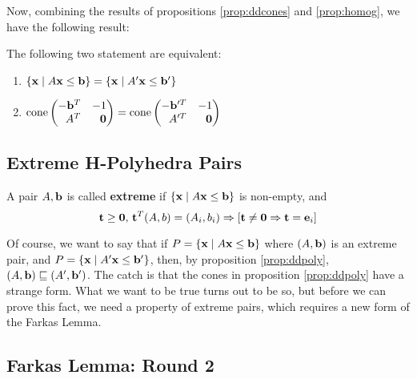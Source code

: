 Now, combining the results of propositions \ref{prop:ddcones} and \ref{prop:homog}, we have the following result:

\begin{Prop}{\label{prop:ddpoly}
		The following two statement are equivalent:
		\begin{enumerate}
			\item $\left\{\mathbf{x}\;|\; A\mathbf{x}\leq \mathbf{b}\right\} = \left\{\mathbf{x}\;|\; A'\mathbf{x}\leq \mathbf{b}'\right\}$
			\item $\cone \pmb -\b^T & -1 \\ A^T & \0 \pme = \cone \pmb -\b'^T & -1 \\ A'^T & \0 \pme$
		\end{enumerate}
	}\end{Prop}

\subsection{Extreme H-Polyhedra Pairs}
\begin{Def}{
		A pair $A,\mathbf{b}$ is called \textbf{extreme} if $\left\{\mathbf{x}\;|\; A\mathbf{x}\leq \mathbf{b}\right\}$ is non-empty, and
		\[ \mathbf{t} \geq \mathbf{0},\, \mathbf{t}^T(A,b) = (A_i,b_i) \Rightarrow [\mathbf{t} \neq \mathbf{0} \Rightarrow \mathbf{t} = \mathbf{e}_i] \]
	}\end{Def}

Of course, we want to say that if $P = \left\{\mathbf{x}\;|\; A\mathbf{x}\leq \mathbf{b}\right\}$ where $(A,\mathbf{b})$ is an extreme pair, and $P = \left\{\mathbf{x}\;|\; A'\mathbf{x}\leq \mathbf{b}'\right\}$, then, by proposition \ref{prop:ddpoly}, $(A,\mathbf{b}) \sqsubseteq (A',\mathbf{b}')$.  The catch is that the cones in proposition \ref{prop:ddpoly} have a strange form.  What we want to be true turns out to be so, but before we can prove this fact, we need a property of extreme pairs, which requires a new form of the Farkas Lemma.

\subsection{Farkas Lemma: Round 2}

